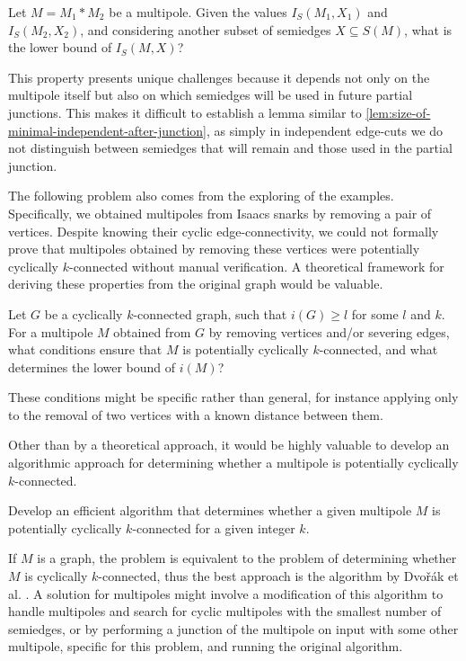 \documentclass[12pt, twoside]{book}
\begin{document}
\begin{problem}
	Let $M=M_1*M_2$ be a multipole. Given the values $I_S(M_1,X_1)$ and $I_S(M_2,X_2)$, and considering another subset of semiedges $X\subseteq S(M)$, what is the lower bound of $I_S(M,X)$?
\end{problem}

This property presents unique challenges because it depends not only on the multipole itself but also on which semiedges will be used in future partial junctions. This makes it difficult to establish a lemma similar to \cref{lem:size-of-minimal-independent-after-junction}, as simply in independent edge-cuts we do not distinguish between semiedges that will remain and those used in the partial junction.

The following problem also comes from the exploring of the examples. Specifically, we obtained multipoles from Isaacs snarks by removing a pair of vertices. Despite knowing their cyclic edge-connectivity, we could not formally prove that multipoles obtained by removing these vertices were potentially cyclically $k$-connected without manual verification. A theoretical framework for deriving these properties from the original graph would be valuable.

\begin{problem}
	Let $G$ be a cyclically $k$-connected graph, such that $i(G)\geq l$ for some $l$ and $k$. For a multipole $M$ obtained from $G$ by removing vertices and/or severing edges, what conditions ensure that $M$ is potentially cyclically $k$-connected, and what determines the lower bound of $i(M)$?
\end{problem}

These conditions might be specific rather than general, for instance applying only to the removal of two vertices with a known distance between them.

Other than by a theoretical approach, it would be highly valuable to develop an algorithmic approach for determining whether a multipole is potentially cyclically $k$-connected.

\begin{problem}
	Develop an efficient algorithm that determines whether a given multipole $M$ is potentially cyclically $k$-connected for a given integer $k$.
\end{problem}

If $M$ is a graph, the problem is equivalent to the problem of determining whether $M$ is cyclically $k$-connected, thus the best approach is the algorithm by Dvořák et al. \cite{Dvorak2004}. A solution for multipoles might involve a modification of this algorithm to handle multipoles and search for cyclic multipoles with the smallest number of semiedges, or by performing a junction of the multipole on input with some other multipole, specific for this problem, and running the original algorithm.
\end{document}

